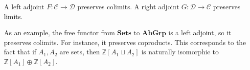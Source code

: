 \begin{proposition} \label{adjlimits}
A left adjoint $F: \mathcal{C} \to \mathcal{D}$ preserves colimits. A right
adjoint $G: \mathcal{D} \to \mathcal{C}$ preserves limits.
\end{proposition} 

As an example, the free functor from $\mathbf{Sets}$ to $\mathbf{AbGrp}$ is a
left adjoint, so it preserves colimits. For instance, it preserves coproducts.
This corresponds to the fact that if $A_1, A_2$ are sets, then $\mathbb{Z}[A_1
\sqcup A_2]$ is naturally isomorphic to $\mathbb{Z}[A_1] \oplus
\mathbb{Z}[A_2]$.


